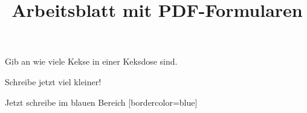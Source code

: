 \documentclass[parskip=half]{scrartcl}
\title{Arbeitsblatt mit PDF-Formularen}
\begin{document}
    \begin{aufgabe}
        Gib an wie viele Kekse in einer Keksdose sind.
    \end{aufgabe}

    \begin{aufgabe}
        Schreibe jetzt viel kleiner!
    \end{aufgabe}

    \begin{aufgabe}
        Jetzt schreibe im blauen Bereich
        [bordercolor=blue]
    \end{aufgabe}
\end{document}
